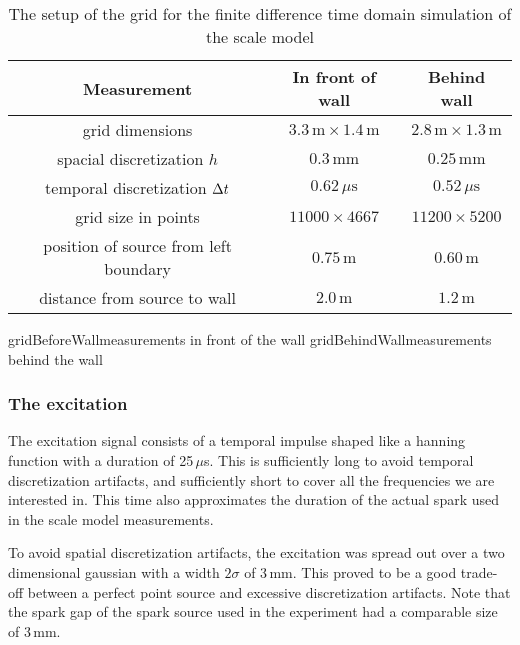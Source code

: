 \begin{table}[htb]
\begin{center}
\caption{The setup of the grid for the finite difference time domain simulation of the scale model\label{gridSetup}}
\begin{tabular}{c|c|c}
Measurement&	In front of wall&	Behind wall\\\hline
grid dimensions&
	$3.3\,\mathrm{m} \times 1.4\,\mathrm{m}$&
	$2.8\,\mathrm{m} \times 1.3\,\mathrm{m}$\\
spacial discretization $h$&
	$0.3\,\mathrm{mm}$&
	$0.25\,\mathrm{mm}$\\
temporal discretization $\Delta t$&
	$0.62\,\mu\mathrm{s}$&
	$0.52\,\mu\mathrm{s}$\\
grid size in points&
	$11000 \times 4667$&
	$11200 \times 5200$\\
position of source from left boundary&
	$0.75\,\mathrm{m}$&
	$0.60\,\mathrm{m}$\\
distance from source to wall&
	$2.0\,\mathrm{m}$&
	$1.2\,\mathrm{m}$\\
\end{tabular}
\end{center}
\end{table}


	{gridBeforeWall}{measurements in front of the wall}
	{gridBehindWall}{measurements behind the wall}




\subsubsection{The excitation}
The excitation signal consists of a temporal impulse shaped like a hanning function with a duration of 25\,$\mu$s. This is sufficiently long to avoid temporal discretization artifacts, and sufficiently short to cover all the frequencies we are interested in. This time also approximates the duration of the actual spark used in the scale model measurements.

To avoid spatial discretization artifacts, the excitation was spread out over a two dimensional gaussian with a width $2\sigma$ of 3\,mm. This proved to be a good trade-off between a perfect point source and excessive discretization artifacts. Note that the spark gap of the spark source used in the experiment had a comparable size of 3\,mm.


